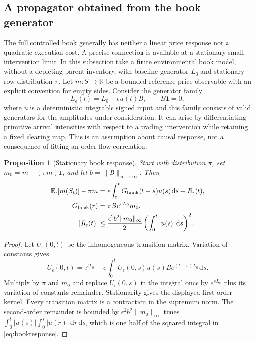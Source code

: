 \documentclass[11pt]{article}
\numberwithin{equation}{section}
\newtheorem{proposition}[theorem]{Proposition}
\theoremstyle{definition}
\theoremstyle{remark}
\newcommand{\R}{\mathbb{R}}
\newcommand{\E}{\mathbb{E}}
\theoremstyle{definition}
\newcommand{\dd}{\,\mathrm d}
\begin{document}
\subsection{A propagator obtained from the book generator}

The full controlled book generally has neither a linear price response nor
a quadratic execution cost. A precise connection is available at a
stationary small-intervention limit. In this subsection take a finite
environmental book model, without a depleting parent inventory, with baseline
generator $L_0$ and stationary row distribution $\pi$. Let $m:S\to\R$ be
a bounded reference-price observable with an explicit convention for empty
sides. Consider the generator family
\[
 L_\epsilon(t)=L_0+\epsilon u(t)B,
 \qquad B\mathbf 1=0,
\]
where $u$ is a deterministic integrable signed input and this family consists
of valid generators for the amplitudes under consideration. It can arise by
differentiating primitive arrival intensities with respect to a trading
intervention while retaining a fixed clearing map. This is an assumption
about causal response, not a consequence of fitting an order-flow correlation.

\begin{proposition}[Stationary book response]\label{prop:bookresponse}
Start with distribution $\pi$, set $m_0=m-(\pi m)\mathbf1$, and let
$b=\lVert B\rVert_{\infty\to\infty}$. Then
\begin{align}\label{eq:bookresponse}
 \E_\epsilon[m(S_t)]-\pi m
 &=\epsilon\int_0^t G_{\rm book}(t-s)u(s)\dd s+R_\epsilon(t),\\
 G_{\rm book}(r)&=\pi B e^{rL_0}m_0,\nonumber\\
 |R_\epsilon(t)|&\le
 \frac{\epsilon^2 b^2\lVert m_0\rVert_\infty}{2}
                 \left(\int_0^t|u(s)|\dd s\right)^2.\nonumber
\end{align}
\end{proposition}
\begin{proof}
Let $U_\epsilon(0,t)$ be the inhomogeneous transition matrix. Variation of
constants gives
\[
 U_\epsilon(0,t)=e^{tL_0}
  +\epsilon\int_0^t U_\epsilon(0,s)u(s)B e^{(t-s)L_0}\dd s.
\]
Multiply by $\pi$ and $m_0$ and replace $U_\epsilon(0,s)$ in the integral
once by $e^{sL_0}$ plus its variation-of-constants remainder. Stationarity
gives the displayed first-order kernel. Every transition matrix is a
contraction in the supremum norm. The second-order remainder is bounded by
$\epsilon^2b^2\lVert m_0\rVert_\infty$ times
$\int_0^t|u(s)|\int_0^s|u(r)|\dd r\dd s$, which is one half of the
squared integral in \eqref{eq:bookresponse}.
\end{proof}
\end{document}
